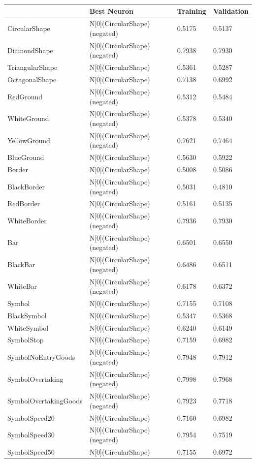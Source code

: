 \begin{tabular}{llll}
\toprule
 & Best Neuron & Training & Validation \\
\midrule
CircularShape & N[0](CircularShape) (negated) & 0.5175 & 0.5137 \\
DiamondShape & N[0](CircularShape) (negated) & 0.7938 & 0.7930 \\
TriangularShape & N[0](CircularShape) & 0.5361 & 0.5287 \\
OctagonalShape & N[0](CircularShape) & 0.7138 & 0.6992 \\
RedGround & N[0](CircularShape) (negated) & 0.5312 & 0.5484 \\
WhiteGround & N[0](CircularShape) (negated) & 0.5378 & 0.5340 \\
YellowGround & N[0](CircularShape) (negated) & 0.7621 & 0.7464 \\
BlueGround & N[0](CircularShape) & 0.5630 & 0.5922 \\
Border & N[0](CircularShape) & 0.5008 & 0.5086 \\
BlackBorder & N[0](CircularShape) (negated) & 0.5031 & 0.4810 \\
RedBorder & N[0](CircularShape) & 0.5161 & 0.5135 \\
WhiteBorder & N[0](CircularShape) (negated) & 0.7936 & 0.7930 \\
Bar & N[0](CircularShape) (negated) & 0.6501 & 0.6550 \\
BlackBar & N[0](CircularShape) (negated) & 0.6486 & 0.6511 \\
WhiteBar & N[0](CircularShape) (negated) & 0.6178 & 0.6372 \\
Symbol & N[0](CircularShape) & 0.7155 & 0.7108 \\
BlackSymbol & N[0](CircularShape) & 0.5347 & 0.5368 \\
WhiteSymbol & N[0](CircularShape) & 0.6240 & 0.6149 \\
SymbolStop & N[0](CircularShape) & 0.7159 & 0.6982 \\
SymbolNoEntryGoods & N[0](CircularShape) (negated) & 0.7948 & 0.7912 \\
SymbolOvertaking & N[0](CircularShape) (negated) & 0.7998 & 0.7968 \\
SymbolOvertakingGoods & N[0](CircularShape) (negated) & 0.7923 & 0.7718 \\
SymbolSpeed20 & N[0](CircularShape) & 0.7160 & 0.6982 \\
SymbolSpeed30 & N[0](CircularShape) (negated) & 0.7954 & 0.7519 \\
SymbolSpeed50 & N[0](CircularShape) & 0.7155 & 0.6972 \\

\end{tabular}
